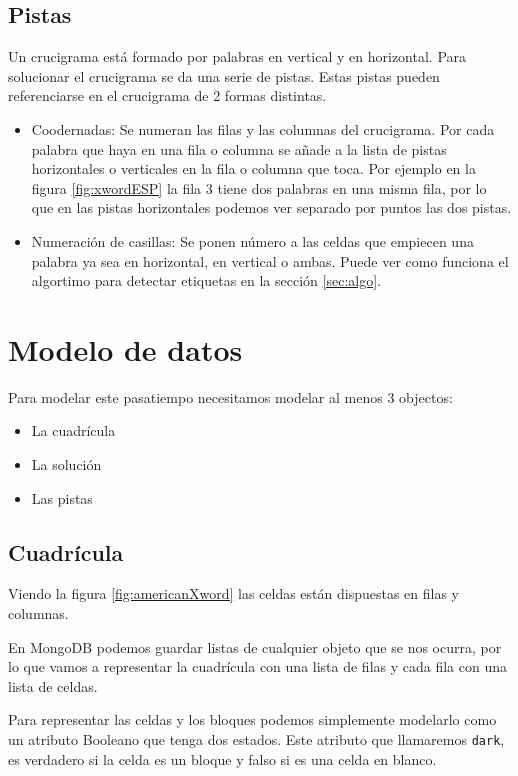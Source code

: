 \documentclass[12pt, a4paper]{article}
\begin{document}
\subsection{Pistas}

Un crucigrama está formado por palabras en vertical y en horizontal. Para
solucionar el crucigrama se da una serie de pistas. Estas pistas pueden
referenciarse en el crucigrama de 2 formas distintas.

\begin{itemize}
	\item Coodernadas: Se numeran las filas y las columnas del crucigrama. Por cada palabra
	que haya en una fila o columna se añade a la lista de pistas horizontales o
	verticales en la fila o columna que toca. Por ejemplo en la figura \ref{fig:xwordESP}
	la fila 3 tiene dos palabras en una misma fila, por lo que en las pistas
	horizontales podemos ver separado por puntos las dos pistas.
	\item Numeración de casillas: Se ponen número a las celdas que empiecen una palabra ya
	sea en horizontal, en vertical o ambas. Puede ver como funciona el algortimo
	para detectar etiquetas en la sección \ref{sec:algo}.
\end{itemize}


\section{Modelo de datos}

Para modelar este pasatiempo necesitamos modelar al menos 3 objectos:

\begin{itemize}
	\item La cuadrícula
	\item La solución
	\item Las pistas
\end{itemize}

\subsection{Cuadrícula}

Viendo la figura \ref{fig:americanXword} las celdas están dispuestas en filas
y columnas.

En MongoDB podemos guardar listas de cualquier objeto que se nos ocurra, por
lo que vamos a representar la cuadrícula con una lista de filas y cada fila
con una lista de celdas. 

Para representar las celdas y los bloques podemos simplemente modelarlo
como un atributo Booleano que tenga dos estados. Este atributo que llamaremos
\verb*|dark|, es verdadero si la celda es un bloque y falso si es una celda
en blanco.
\end{document}
